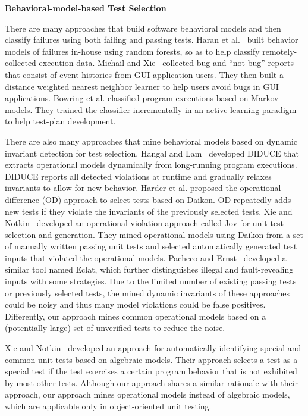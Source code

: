 \documentclass{sig-alternate}
\begin{document}
\textbf{Behavioral-model-based Test Selection}



There are many approaches that build software behavioral models and
then classify failures using both failing and passing tests. Haran
et al.~\cite{Haran05} built behavior models of failures in-house
using random forests, so as to help classify remotely-collected
execution data. Michail and Xie~\cite{Michail05} collected bug and
``not bug'' reports that consist of event histories from GUI
application users. They then built a distance weighted nearest
neighbor learner to help users avoid bugs in GUI applications.
Bowring et al. \cite{Bowring04} classified program executions based
on Markov models. They trained the classifier incrementally in an
active-learning paradigm to help test-plan development.

There are also many approaches that mine behavioral models based on
dynamic invariant detection for test selection. Hangal and
Lam~\cite{Hangal02} developed DIDUCE that extracts operational
models dynamically from long-running program executions. DIDUCE
reports all detected violations at runtime and gradually relaxes
invariants to allow for new behavior. Harder et al. \cite{Harder03}
proposed the operational difference (OD) approach to select tests
based on Daikon. OD repeatedly adds new tests if they violate the
invariants of the previously selected tests. Xie and
Notkin~\cite{Xie03} developed an operational violation approach
called Jov for unit-test selection and generation. They mined
operational models using Daikon from a set of manually written
passing unit tests and selected automatically generated test inputs
that violated the operational models. Pacheco and
Ernst~\cite{Pacheco05} developed a similar tool named Eclat, which
further distinguishes illegal and fault-revealing inputs with some
strategies. Due to the limited number of existing passing tests or
previously selected tests, the mined dynamic invariants of these
approaches could be noisy and thus many model violations could be
false positives. Differently, our approach mines common operational
models based on a (potentially large) set of unverified tests to
reduce the noise.

Xie and Notkin~\cite{Xie05} developed an approach for automatically
identifying special and common unit tests based on algebraic models.
Their approach selects a test as a special test if the test
exercises a certain program behavior that is not exhibited by most
other tests. Although our approach shares a similar rationale with
their approach, our approach mines operational models instead of
algebraic models, which are applicable only in object-oriented unit
testing.
\end{document}
